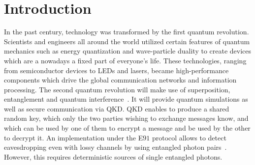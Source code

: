 \chapter{Introduction}

In the past century, technology was transformed by the first quantum revolution. Scientists and engineers all around the world utilized certain features of quantum mechanics such as energy quantization and wave-particle duality to create devices which are a nowadays a fixed part of everyone's life.
These technologies, ranging from semiconductor devices to LEDs and lasers, became high-performance components which drive the global communication networks and information processing.
The second quantum revolution will make use of superposition, entanglement and quantum interference~\cite{macfarlane_quantum_2003}.
It will provide quantum simulations as well as secure communication via \ac{QKD}.
\ac{QKD} enables to produce a shared random key, which only the two parties wishing to exchange messages know, and which can be used by one of them to encrypt a message and be used by the other to decrypt it.
An implementation under the E$91$ protocol allows to detect eavesdropping even with lossy channels by using entangled photon pairs~\cite{ekert_quantum_1991}.
However, this requires deterministic sources of single entangled photons.

